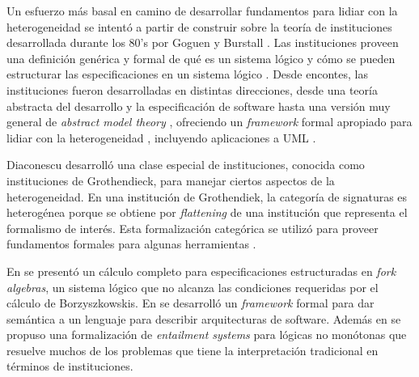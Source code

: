 \documentclass[a4paper, 11pt]{article}
\begin{document}
Un esfuerzo más basal en camino de desarrollar fundamentos para lidiar con la heterogeneidad se intentó a partir de construir sobre la teoría de instituciones desarrollada durante los 80's por Goguen y Burstall \cite{goguen:cmwlp84}. Las instituciones proveen una definición genérica y formal de qué es un sistema lógico y cómo se pueden estructurar las especificaciones en un sistema lógico \cite{sannella:ic-76_2-3}. Desde encontes, las instituciones fueron desarrolladas en distintas direcciones, desde una teoría abstracta del desarrollo y la especificación de software \cite{tarlecki:nato-asimalles03} hasta una versión muy general de \emph{abstract model theory} \cite{diaconescu08}, ofreciendo un \emph{framework} formal apropiado para lidiar con la heterogeneidad \cite{mossakowski:tacas07,tarlecki:gabbay00}, incluyendo aplicaciones a UML \cite{cengarle:cgm08}.

Diaconescu \cite{diaconescu:acs-10_4} desarrolló una clase especial de instituciones, conocida como instituciones de Grothendieck, para manejar ciertos aspectos de la heterogeneidad. En una institución de Grothendiek, la categoría de signaturas es heterogénea porque se obtiene por \emph{flattening} de una institución que representa el formalismo de interés. Esta formalización categórica se utilizó para proveer fundamentos formales para algunas herramientas \cite{diaconescu:tcs-285_2,mossakowski:tacas07}.

En \cite{lopezpombo:ictac10} se presentó un cálculo completo para especificaciones estructuradas en \emph{fork algebras}, un sistema lógico que no alcanza las condiciones requeridas por el cálculo de Borzyszkowskis. En \cite{castro:ictac10} se desarrolló un \emph{framework} formal para dar semántica a un lenguaje para describir arquitecturas de software. Además en \cite{cassano:wadt2012} se propuso una formalización de \emph{entailment systems} para lógicas no monótonas que resuelve muchos de los problemas que tiene la interpretación tradicional en términos de instituciones. 



\newcommand{\paperola}{\emph{An Abstract Heterogeneous Characterization of Component Based Systems in a Categorical Setting}}
\end{document}
